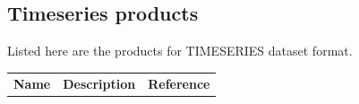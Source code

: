 \documentclass[a4paper,11pt,pdftex,twoside]{scrartcl}
\renewcommand{\bf}{\normalfont \bfseries}
\begin{document}
{{{%








\newpage
\subsection{Timeseries products}
Listed here are the products for TIMESERIES dataset format.

\begin{table}[H]
\begin{tabularx}{\textwidth}{lXl}
{\bf Name} & {\bf Description} & {\bf Reference}\\


\end{tabularx}
\end{table}}}}
\end{document}
